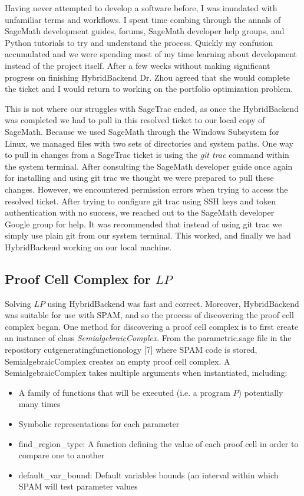 \documentclass{article}
\begin{document}
Having never attempted to develop a software before, I was inundated with unfamiliar terms and workflows. I spent time combing through the annals of SageMath development guides, forums, SageMath developer help groups, and Python tutorials to try and understand the process. Quickly my confusion accumulated and we were spending most of my time learning about development instead of the project itself. After a few weeks without making significant progress on finishing HybridBackend Dr. Zhou agreed that she would complete the ticket and I would return to working on the portfolio optimization problem.

This is not where our struggles with SageTrac ended, as once the HybridBackend was completed we had to pull in this resolved ticket to our local copy of SageMath. Because we used SageMath through the Windows Subsystem for Linux, we managed files with two sets of directories and system paths. One way to pull in changes from a SageTrac ticket is using the \textit{git trac} command within the system terminal. After consulting the SageMath developer guide once again for installing and using git trac we thought we were prepared to pull these changes. However, we encountered permission errors when trying to access the resolved ticket. After trying to configure git trac using SSH keys and token authentication with no success, we reached out to the SageMath developer Google group for help. It was recommended that instead of using git trac we simply use plain git from our system terminal. This worked, and finally we had HybridBackend working on our local machine. 

\subsection{Proof Cell Complex for $LP$}

Solving $LP$ using HybridBackend was fast and correct. Moreover, HybridBackend was suitable for use with SPAM, and so the process of discovering the proof cell complex began. One method for discovering a proof cell complex is to first create an instance of class \textit{SemialgebraicComplex}. From the parametric.sage file in the repository cutgeneratingfunctionology [7] where SPAM code is stored, SemialgebraicComplex creates an empty proof cell complex. A SemialgebraicComplex takes multiple arguments when instantiated, including:

\begin{itemize}
    \item A family of functions that will be executed (i.e. a program $P$) potentially many times
    \item Symbolic representations for each parameter
    \item find\_region\_type: A function defining the value of each proof cell in order to compare one to another
    \item default\_var\_bound: Default variables bounds (an interval within which SPAM will test parameter values
\end{itemize}
\end{document}
